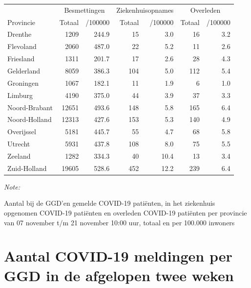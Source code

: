 \documentclass[
  english,
  man,floatsintext]{apa6}
\begin{document}
\begin{table}[H]
\centering
\begin{threeparttable}
\begin{tabular}{lrrrrrr}
\toprule
\multicolumn{1}{c}{ } & \multicolumn{2}{c}{Besmettingen} & \multicolumn{2}{c}{Ziekenhuisopnames} & \multicolumn{2}{c}{Overleden} \\
\cmidrule(l{3pt}r{3pt}){2-3} \cmidrule(l{3pt}r{3pt}){4-5} \cmidrule(l{3pt}r{3pt}){6-7}
Provincie & Totaal & /100000 & Totaal & /100000 & Totaal & /100000\\
\midrule
Drenthe & 1209 & 244.9 & 15 & 3.0 & 16 & 3.2\\
Flevoland & 2060 & 487.0 & 22 & 5.2 & 11 & 2.6\\
Friesland & 1311 & 201.7 & 17 & 2.6 & 28 & 4.3\\
Gelderland & 8059 & 386.3 & 104 & 5.0 & 112 & 5.4\\
Groningen & 1067 & 182.1 & 11 & 1.9 & 6 & 1.0\\
Limburg & 4190 & 375.0 & 44 & 3.9 & 37 & 3.3\\
Noord-Brabant & 12651 & 493.6 & 148 & 5.8 & 165 & 6.4\\
Noord-Holland & 12313 & 427.6 & 153 & 5.3 & 140 & 4.9\\
Overijssel & 5181 & 445.7 & 55 & 4.7 & 68 & 5.8\\
Utrecht & 5931 & 437.8 & 108 & 8.0 & 75 & 5.5\\
Zeeland & 1282 & 334.3 & 40 & 10.4 & 13 & 3.4\\
Zuid-Holland & 19605 & 528.6 & 452 & 12.2 & 239 & 6.4\\
\bottomrule
\end{tabular}
\begin{tablenotes}
\item \textit{Note: } 
\item Aantal bij de GGD’en gemelde COVID-19 patiënten, in het ziekenhuis opgenomen COVID-19 patiënten en overleden COVID-19 patiënten per provincie van 07 november t/m 21 november 10:00 uur, totaal en per 100.000 inwoners
\end{tablenotes}
\end{threeparttable}
\end{table}

\newpage

\hypertarget{aantal-covid-19-meldingen-per-ggd-in-de-afgelopen-twee-weken}{%
\section{Aantal COVID-19 meldingen per GGD in de afgelopen twee weken}\label{aantal-covid-19-meldingen-per-ggd-in-de-afgelopen-twee-weken}}
\end{document}
